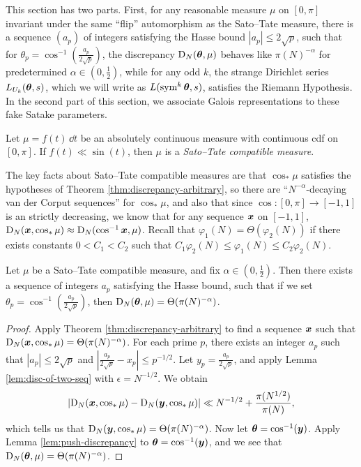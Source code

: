 This section has two parts. First, for any reasonable measure $\mu$ on 
$[0,\pi]$ invariant under the same ``flip'' automorphism as the Sato--Tate 
measure, there is a sequence $(a_p)$ of integers satisfying the Hasse 
bound $|a_p|\leqslant 2\sqrt p$, such that for 
$\theta_p = \cos^{-1}\left(\frac{a_p}{2\sqrt p}\right)$, the discrepancy 
$\operatorname{D}_N({\boldsymbol\theta},\mu)$ behaves like $\pi(N)^{-\alpha}$ for predetermined 
$\alpha\in \left(0,\frac 1 2\right)$, while for any odd $k$, the strange 
Dirichlet series $L_{U_k}({\boldsymbol\theta},s)$, which we will write as 
$L(\operatorname{sym}^k {\boldsymbol\theta},s)$, satisfies the Riemann Hypothesis. In the second part of 
this section, we associate Galois representations to these fake Satake 
parameters. 

\begin{definition}
Let $\mu = f(t)\, \dd t$ be an absolutely continuous measure with continuous 
cdf on $[0,\pi]$. If $f(t) \ll \sin(t)$, then $\mu$ is a \emph{Sato--Tate compatible measure}. 
\end{definition}

The key facts about Sato--Tate compatible measures are that $\cos_\ast\mu$ 
satisfies the hypotheses of Theorem \ref{thm:discrepancy-arbitrary}, so 
there are ``$N^{-\alpha}$-decaying van der Corput sequences'' for 
$\cos_\ast\mu$, and also that since $\cos\colon [0,\pi] \to [-1,1]$ is an 
strictly decreasing, we know that for any sequence ${\boldsymbol x}$ on $[-1,1]$, 
$\operatorname{D}_N({\boldsymbol x},\cos_\ast\mu) \approx \operatorname{D}_N(\cos^{-1}{\boldsymbol x},\mu)$. Recall that 
$\varphi_1(N) = \Theta(\varphi_2(N))$ if there exists constants 
$0 < C_1 < C_2$ such that 
$C_1 \varphi_2(N) \leqslant \varphi_1(N) \leqslant C_2 \varphi_2(N)$. 


\begin{theorem}\label{thm:integral-a_p-alpha}
Let $\mu$ be a Sato--Tate compatible measure, and fix 
$\alpha\in \left(0,\frac 1 2\right)$. 
Then there exists a sequence of integers $a_p$ satisfying the Hasse bound, 
such that if we set $\theta_p = \cos^{-1}\left(\frac{a_p}{2\sqrt p}\right)$, 
then $\operatorname{D}_N({\boldsymbol\theta},\mu) = \Theta(\pi(N)^{-\alpha})$. 
\end{theorem}
\begin{proof}
Apply Theorem \ref{thm:discrepancy-arbitrary} to find a sequence ${\boldsymbol x}$ such 
that $\operatorname{D}_N({\boldsymbol x},\cos_\ast \mu) = \Theta(\pi(N)^{-\alpha})$. For each prime 
$p$, there exists an integer $a_p$ such that $|a_p|\leqslant 2\sqrt p$ and 
$\left| \frac{a_p}{2\sqrt p} - x_p\right| \leqslant p^{-1/2}$. Let 
$y_p = \frac{a_p}{2\sqrt p}$, and apply Lemma \ref{lem:disc-of-two-seq} with 
$\epsilon = N^{-1/2}$. We obtain 
\[
	\left| \operatorname{D}_N({\boldsymbol x},\cos_\ast \mu) - \operatorname{D}_N({\boldsymbol y}, \cos_\ast \mu)\right| \ll  N^{-1/2} + \frac{\pi(N^{1/2})}{\pi(N)} ,
\]
which tells us that $\operatorname{D}_N({\boldsymbol y},\cos_\ast\mu) = \Theta(\pi(N)^{-\alpha})$. 
Now let ${\boldsymbol\theta} = \cos^{-1}({\boldsymbol y})$. Apply Lemma \ref{lem:push-discrepancy} to 
${\boldsymbol\theta} = \cos^{-1}({\boldsymbol y})$, and we see that 
$\operatorname{D}_N({\boldsymbol\theta},\mu) = \Theta(\pi(N)^{-\alpha})$. 
\end{proof}

